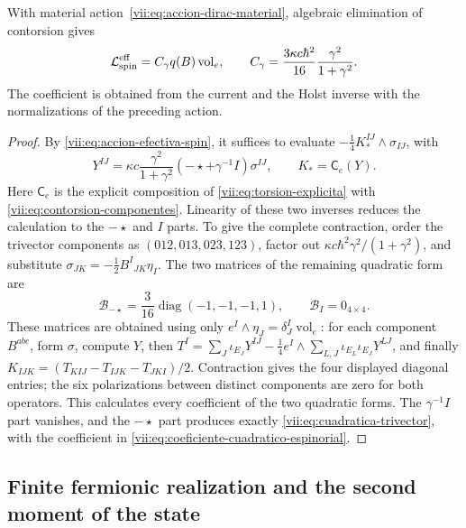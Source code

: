 \begin{theorem}
\label{vii:thm:coeficiente-torsional-espinorial}
With material action~\eqref{vii:eq:accion-dirac-material}, algebraic
elimination of contorsion gives
\begin{equation}
 \mathcal L_{\rm spin}^{\rm eff}
 =C_\gamma q(B)\operatorname{vol}_e,\qquad
 C_\gamma=\frac{3\kappa c\hbar^2}{16}
                      \frac{\gamma^2}{1+\gamma^2}.
 \label{vii:eq:coeficiente-cuadratico-espinorial}
\end{equation}
The coefficient is obtained from the current and the Holst inverse
with the normalizations of the preceding action.
\end{theorem}
\begin{proof}
By \eqref{vii:eq:accion-efectiva-spin}, it suffices to evaluate
\(-\frac14K_*^{IJ}\wedge\sigma_{IJ}\), with
\[
 Y^{IJ}=\kappa c\frac{\gamma^2}{1+\gamma^2}
           (-\star+\gamma^{-1}I)\sigma^{IJ},\qquad
 K_*=\mathsf C_e(Y).
\]
Here \(\mathsf C_e\) is the explicit composition of
\eqref{vii:eq:torsion-explicita} with
\eqref{vii:eq:contorsion-componentes}. Linearity of these two
inverses reduces the calculation to the \(-\star\) and \(I\) parts.
To give the complete contraction, order the trivector components
as \((012,013,023,123)\), factor out
\(\kappa c\hbar^2\gamma^2/(1+\gamma^2)\), and substitute
\(\sigma_{JK}=-\frac12B^I{}_{JK}\eta_I\). The two matrices
of the remaining quadratic form are
\begin{equation}
 \mathcal B_{-\star}
 =\frac3{16}\operatorname{diag}(-1,-1,-1,1),\qquad
 \mathcal B_I=0_{4\times4}.
 \label{vii:eq:matrices-contraccion-espinorial}
\end{equation}
These matrices are obtained using only
\(e^I\wedge\eta_J=\delta_J^I\operatorname{vol}_e\): for
each component \(B^{abc}\), form \(\sigma\), compute
\(Y\), then
\(T^I=\sum_J\iota_{E_J}Y^{IJ}
 -\frac14e^I\wedge\sum_{L,J}\iota_{E_L}\iota_{E_J}Y^{LJ}\),
and finally
\(K_{IJK}=(T_{KIJ}-T_{IJK}-T_{JKI})/2\).
Contraction gives the four displayed diagonal entries; the
six polarizations between distinct components are zero for both
operators. This calculates every coefficient of the two
quadratic forms. The \(\gamma^{-1}I\) part vanishes, and the
\(-\star\) part produces exactly \eqref{vii:eq:cuadratica-trivector},
with the coefficient in \eqref{vii:eq:coeficiente-cuadratico-espinorial}.
\end{proof}

\subsection{Finite fermionic realization and the second moment of the state}
\label{vii:subsec:segundo-momento-car}

